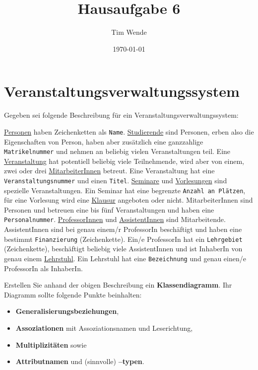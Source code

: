 \documentclass{article}
\author{Tim Wende}
\date{\today}
\title{\textbf{Hausaufgabe 6}}
\begin{document}
    \maketitle
    \section*{Veranstaltungsverwaltungssystem}

    Gegeben sei folgende Beschreibung für ein Veranstaltungsverwaltungssystem:

    \underline{Personen} haben Zeichenketten als \texttt{Name}.
    \underline{Studierende} sind Personen, erben also die Eigenschaften von Person, haben aber zusätzlich eine ganzzahlige \texttt{Matrikelnummer} und nehmen an beliebig vielen Veranstaltungen teil.
    Eine \underline{Veranstaltung} hat potentiell beliebig viele Teilnehmende, wird aber von einem, zwei oder drei \underline{MitarbeiterInnen} betreut.
    Eine Veranstaltung hat eine \texttt{Veranstaltungsnummer} und einen \texttt{Titel}.
    \underline{Seminare} und \underline{Vorlesungen} sind spezielle Veranstaltungen.
    Ein Seminar hat eine begrenzte \texttt{Anzahl an Plätzen}, für eine Vorlesung wird eine \underline{Klausur} angeboten oder nicht.
    MitarbeiterInnen sind Personen und betreuen eine bis fünf Veranstaltungen und haben eine \texttt{Personalnummer}.
    \underline{ProfessorInnen} und \underline{AssistentInnen} sind Mitarbeitende.
    AssistentInnen sind bei genau einem/r ProfessorIn beschäftigt und haben eine bestimmt \texttt{Finanzierung} (Zeichenkette).
    Ein/e ProfessorIn hat ein \texttt{Lehrgebiet} (Zeichenkette), beschäftigt beliebig viele AssistentInnen und ist InhaberIn von genau einem \underline{Lehrstuhl}.
    Ein Lehrstuhl hat eine \texttt{Bezeichnung} und genau einen/e ProfessorIn als InhaberIn.
    
    Erstellen Sie anhand der obigen Beschreibung ein \textbf{Klassendiagramm}. Ihr Diagramm sollte folgende Punkte beinhalten:
    
    \begin{itemize}
        \setlength{\itemsep}{0em}
        \item \textbf{Generalisierungsbeziehungen},
        \item \textbf{Assoziationen} mit Assoziationsnamen und Leserichtung,
        \item \textbf{Multiplizitäten} sowie
        \item \textbf{Attributnamen} und (sinnvolle) \textbf{–typen}.
    \end{itemize}
\end{document}
